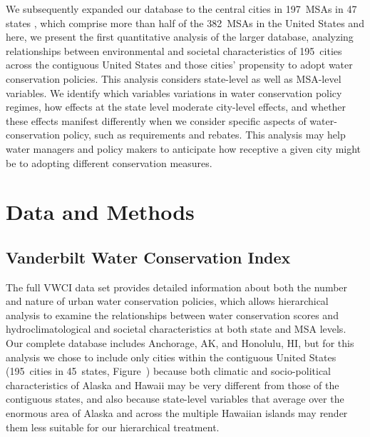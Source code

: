 \documentclass[draft,linenumbers]{agujournal}
\begin{document}
We subsequently expanded our database to the central cities in
197~MSAs in 47 states \citep{hess:vwci:2017},
which comprise more than half of the 382~MSAs in the United States
\citep{census:population:2015} and here, we present the first quantitative
analysis of the larger database, analyzing relationships between environmental
and societal characteristics of 195~cities across the contiguous
United States and those cities' propensity to adopt water conservation policies.
This analysis considers state-level as well as MSA-level variables. We identify
which variables
%
variations in water conservation policy regimes,
how effects at the state level moderate city-level effects, and whether these
effects manifest differently when we consider specific aspects of
water-conservation policy, such as requirements and rebates.
This analysis may help water managers and policy makers to anticipate how
receptive a given city might be to adopting different conservation measures.

\section{Data and Methods}
\label{sec:data.methods}
\subsection{Vanderbilt Water Conservation Index}
%
%
%

%
%



The full VWCI data set provides detailed information about both the number and
nature of urban water conservation policies, which  allows hierarchical analysis
to examine the relationships between water conservation scores and
hydroclimatological and societal characteristics at both state and MSA levels.
Our complete database includes Anchorage, AK, and Honolulu, HI, but for this
analysis we chose to include only cities within the contiguous United States
(195~cities in 45~states,
Figure~)
%
because both
climatic and socio-political characteristics of Alaska and Hawaii may be very
different from those of the contiguous states, and also because state-level
variables that average over the enormous area of Alaska and across the multiple
Hawaiian islands may render them less suitable for our hierarchical treatment.
\end{document}
